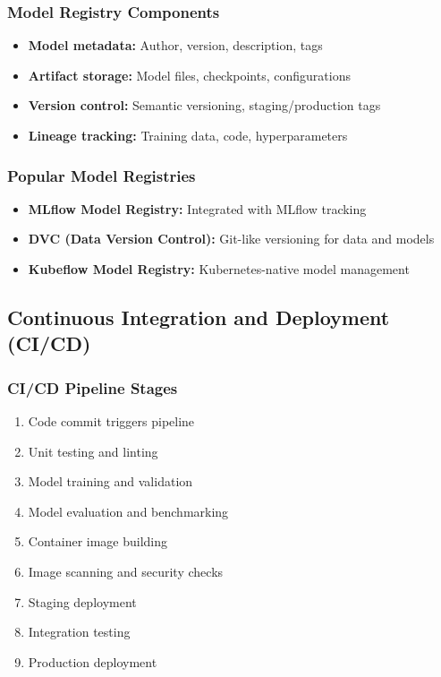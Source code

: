 \documentclass[11pt]{article}
\begin{document}
\subsubsection{Model Registry Components}
\begin{itemize}
    \item \textbf{Model metadata:} Author, version, description, tags
    \item \textbf{Artifact storage:} Model files, checkpoints, configurations
    \item \textbf{Version control:} Semantic versioning, staging/production tags
    \item \textbf{Lineage tracking:} Training data, code, hyperparameters
\end{itemize}

\subsubsection{Popular Model Registries}
\begin{itemize}
    \item \textbf{MLflow Model Registry:} Integrated with MLflow tracking
    \item \textbf{DVC (Data Version Control):} Git-like versioning for data and models
    \item \textbf{Kubeflow Model Registry:} Kubernetes-native model management
\end{itemize}

\subsection{Continuous Integration and Deployment (CI/CD)}

\subsubsection{CI/CD Pipeline Stages}
\begin{enumerate}
    \item Code commit triggers pipeline
    \item Unit testing and linting
    \item Model training and validation
    \item Model evaluation and benchmarking
    \item Container image building
    \item Image scanning and security checks
    \item Staging deployment
    \item Integration testing
    \item Production deployment
\end{enumerate}
\end{document}
